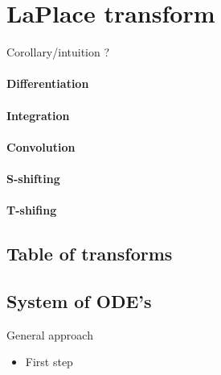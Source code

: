 \section{LaPlace transform}
Corollary/intuition ?


\paragraph{Differentiation}
\paragraph{Integration}
\paragraph{Convolution}
\paragraph{S-shifting}
\paragraph{T-shifing}

\subsection{Table of transforms}

\subsection{System of ODE's}

General approach
\begin{itemize}

  \item First step

\end{itemize}
